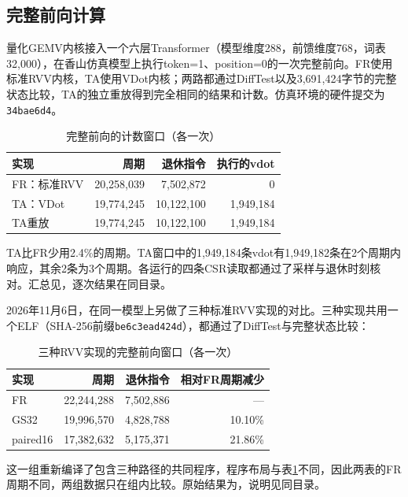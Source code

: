 \subsection{完整前向计算}\label{sec:s3-forward}

量化GEMV内核接入一个六层Transformer（模型维度288，前馈维度768，词表32,000），在香山仿真模型上执行token=1、position=0的一次完整前向。FR使用标准RVV内核，TA使用VDot内核；两路都通过DiffTest以及3,691,424字节的完整状态比较，TA的独立重放得到完全相同的结果和计数。仿真环境的硬件提交为\texttt{34bae6d4}。

\begin{table}[!htbp]\centering\small
\caption{完整前向的计数窗口（各一次）}\label{tab:forward}
\begin{tabular}{lrrr}
\toprule
实现 & 周期 & 退休指令 & 执行的vdot\\
\midrule
FR：标准RVV & 20,258,039 & 7,502,872 & 0\\
TA：VDot & 19,774,245 & 10,122,100 & 1,949,184\\
TA重放 & 19,774,245 & 10,122,100 & 1,949,184\\
\bottomrule
\end{tabular}
\end{table}

TA比FR少用2.4\%的周期。TA窗口中的1,949,184条vdot有1,949,182条在2个周期内响应，其余2条为3个周期。各运行的四条CSR读取都通过了采样与退休时刻核对。汇总见，逐次结果在同目录。

2026年11月6日，在同一模型上另做了三种标准RVV实现的对比。三种实现共用一个ELF（SHA-256前缀\texttt{be6c3ead424d}），都通过了DiffTest与完整状态比较：

\begin{table}[!htbp]\centering\small
\caption{三种RVV实现的完整前向窗口（各一次）}\label{tab:rvv3}
\begin{tabular}{lrrr}
\toprule
实现 & 周期 & 退休指令 & 相对FR周期减少\\
\midrule
FR & 22,244,288 & 7,502,886 & ---\\
GS32 & 19,996,570 & 4,828,788 & 10.10\%\\
paired16 & 17,382,632 & 5,175,371 & 21.86\%\\
\bottomrule
\end{tabular}
\end{table}

这一组重新编译了包含三种路径的共同程序，程序布局与表\ref{tab:forward}不同，因此两表的FR周期不同，两组数据只在组内比较。原始结果为，说明见同目录。

